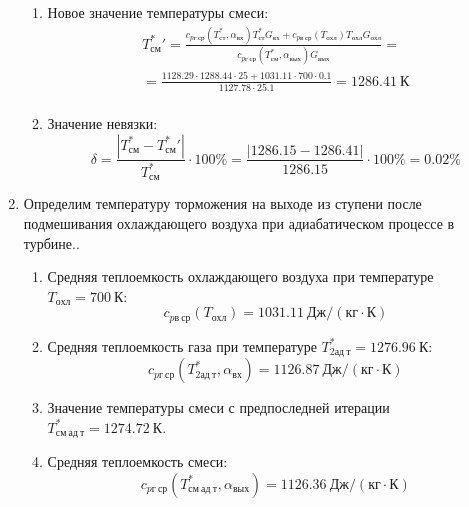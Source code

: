 \documentclass[a4paper,10pt]{article}
\begin{document}
\begin{enumerate}
\begin{enumerate}
            \item Новое значение температуры смеси:
            \begin{gather*}
                T_{см}^*\prime = \frac{
                        c_{pг\ ср} (T_{ст}^*, \alpha_{вх}) T_{ст}^* G_{вх} + c_{pв\ ср} (T_{охл}) T_{охл} G_{охл}
                    }{
                        c_{pг\ ср} (T_{см}^{*}, \alpha_{вых}) G_{вых}
                    } =\\
                = \frac{
                    1128.29
                    \cdot 1288.44 \cdot 25 +
                    1031.11
                    \cdot 700 \cdot 0.1
                }{
                    1127.78
                    \cdot  25.1
                } =
                1286.41\ К\\
            \end{gather*}

            \item Значение невязки:
            \[
                \delta = \frac{ \left| T_{см}^{*} - T_{см}^*\prime \right| }{T_{см}^{*}} \cdot 100 \% =
                    \frac{
                        \left| 1286.15 - 1286.41 \right|
                    }{
                        1286.15
                    } \cdot 100 \% =
                0.02 \%
            \]
        \end{enumerate}


        \item Определим температуру торможения на выходе из ступени после подмешивания охлаждающего воздуха при адиабатическом процессе в турбине..
        \begin{enumerate}

            \item Средняя теплоемкость охлаждающего воздуха при температуре $T_{охл} = 700\ К $:
            \[
                c_{pв\ ср} (T_{охл}) = 1031.11\ Дж/ (кг \cdot К)
            \]

            \item Средняя теплоемкость газа при температуре $T_{2ад\ т}^* = 1276.96 \ К $:
            \[
                c_{pг\ ср} (T_{2ад\ т}^*, \alpha_{вх}) =
                1126.87\ Дж/ (кг \cdot К)
            \]

            \item Значение температуры смеси с предпоследней итерации $T_{см\ ад\ т}^{*} = 1274.72\ К$.

            \item Средняя теплоемкость смеси:
            \[
                c_{pг\ ср} (T_{см\ ад\ т}^{*}, \alpha_{вых}) =
                1126.36\ Дж/ (кг \cdot К)
            \]


\end{enumerate}
\end{enumerate}
\end{document}
